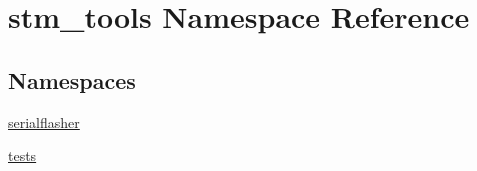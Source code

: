 \hypertarget{namespacestm__tools}{}\section{stm\+\_\+tools Namespace Reference}
\label{namespacestm__tools}
\subsection*{Namespaces}
\begin{DoxyCompactItemize}
\item 
 \hyperlink{namespacestm__tools_1_1serialflasher}{serialflasher}
\item 
 \hyperlink{namespacestm__tools_1_1tests}{tests}
\end{DoxyCompactItemize}
